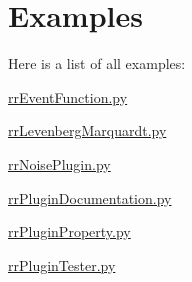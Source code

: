 \section{Examples}
Here is a list of all examples\-:\begin{DoxyCompactItemize}
\item 
\hyperlink{rr_event_function_8py-example}{rr\-Event\-Function.\-py}
\item 
\hyperlink{rr_levenberg_marquardt_8py-example}{rr\-Levenberg\-Marquardt.\-py}
\item 
\hyperlink{rr_noise_plugin_8py-example}{rr\-Noise\-Plugin.\-py}
\item 
\hyperlink{rr_plugin_documentation_8py-example}{rr\-Plugin\-Documentation.\-py}
\item 
\hyperlink{rr_plugin_property_8py-example}{rr\-Plugin\-Property.\-py}
\item 
\hyperlink{rr_plugin_tester_8py-example}{rr\-Plugin\-Tester.\-py}
\end{DoxyCompactItemize}
